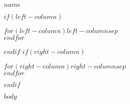 \documentclass[$if(fontsize)$$fontsize$$else$10pt$endif$,letterpaper]{article}
\def\name{$name$}
\begin{document}
{\huge \name}

\bigskip

$if(left-column)$
\begin{minipage}[t]{0.495\textwidth}
  $for(left-column)$$left-column$$sep$ \\ $endfor$
\end{minipage} %
$endif$
$if(right-column)$
\begin{minipage}[t]{0.495\textwidth}
  $for(right-column)$$right-column$$sep$ \\ $endfor$
\end{minipage}
$endif$

$body$
\end{document}
